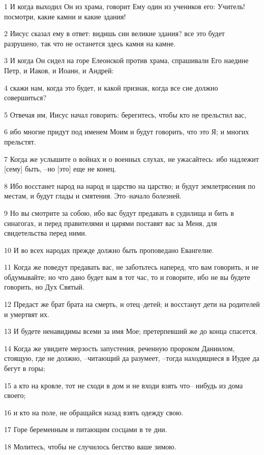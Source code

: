 \par 1 И когда выходил Он из храма, говорит Ему один из учеников его: Учитель! посмотри, какие камни и какие здания!
\par 2 Иисус сказал ему в ответ: видишь сии великие здания? все это будет разрушено, так что не останется здесь камня на камне.
\par 3 И когда Он сидел на горе Елеонской против храма, спрашивали Его наедине Петр, и Иаков, и Иоанн, и Андрей:
\par 4 скажи нам, когда это будет, и какой признак, когда все сие должно совершиться?
\par 5 Отвечая им, Иисус начал говорить: берегитесь, чтобы кто не прельстил вас,
\par 6 ибо многие придут под именем Моим и будут говорить, что это Я; и многих прельстят.
\par 7 Когда же услышите о войнах и о военных слухах, не ужасайтесь: ибо надлежит [сему] быть, --но [это] еще не конец.
\par 8 Ибо восстанет народ на народ и царство на царство; и будут землетрясения по местам, и будут глады и смятения. Это--начало болезней.
\par 9 Но вы смотрите за собою, ибо вас будут предавать в судилища и бить в синагогах, и перед правителями и царями поставят вас за Меня, для свидетельства перед ними.
\par 10 И во всех народах прежде должно быть проповедано Евангелие.
\par 11 Когда же поведут предавать вас, не заботьтесь наперед, что вам говорить, и не обдумывайте; но что дано будет вам в тот час, то и говорите, ибо не вы будете говорить, но Дух Святый.
\par 12 Предаст же брат брата на смерть, и отец--детей; и восстанут дети на родителей и умертвят их.
\par 13 И будете ненавидимы всеми за имя Мое; претерпевший же до конца спасется.
\par 14 Когда же увидите мерзость запустения, реченную пророком Даниилом, стоящую, где не должно, --читающий да разумеет, --тогда находящиеся в Иудее да бегут в горы;
\par 15 а кто на кровле, тот не сходи в дом и не входи взять что-- нибудь из дома своего;
\par 16 и кто на поле, не обращайся назад взять одежду свою.
\par 17 Горе беременным и питающим сосцами в те дни.
\par 18 Молитесь, чтобы не случилось бегство ваше зимою.
